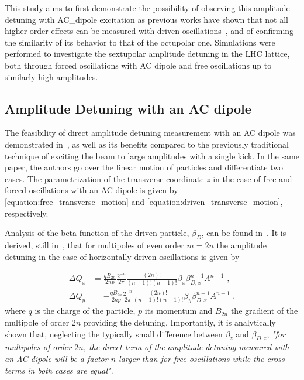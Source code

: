 This study aims to first demonstrate the possibility of observing this amplitude detuning with \gls{AC_dipole} excitation as previous works have shown that not all higher order effects can be measured with driven oscillations~\cite{PRAB:Persson:Suppression_Amplitude_Dependent_Closest_Tune_Approach}, and of confirming the similarity of its behavior to that of the octupolar one.
Simulations were performed to investigate the sextupolar amplitude detuning in the \gls{LHC} lattice, both through forced oscillations with AC dipole and free oscillations up to similarly high amplitudes.

\subsection*{Amplitude Detuning with an AC dipole}

The feasibility of direct amplitude detuning measurement with an AC dipole was demonstrated in~\cite{PRAB:White:Direct_Amplitude_Detuning_AC_Dipole}, as well as its benefits compared to the previously traditional technique of exciting the beam to large amplitudes with a single kick.
In the same paper, the authors go over the linear motion of particles and differentiate two cases.
The parametrization of the transverse coordinate \(z\) in the case of free and forced oscillations with an AC dipole is given by \cref{equation:free_transverse_motion} and \cref{equation:driven_transverse_motion}, respectively.

Analysis of the \gls{beta-function} of the driven particle, \(\beta_D\), can be found in~\cite{PHD:Miyamoto,PRAB:Miyamoto:Parametrization_Driven_Betatron_Oscillation,PRAB:White:Direct_Amplitude_Detuning_AC_Dipole}.
It is derived, still in~\cite{PRAB:White:Direct_Amplitude_Detuning_AC_Dipole}, that for multipoles of even order \(m = 2n\) the amplitude detuning in the case of horizontally driven oscillations is given by

\begin{equation}
    \begin{aligned}
        \Delta Q_x &= \frac{q B_{2n}}{2np} \frac{2^{-n}}{2 \pi} \frac{(2n)!}{(n-1)! (n-1)!} \beta_x \beta_{D,x}^{n-1} A^{n-1} \text{ ,} \\
        \Delta Q_y &= -\frac{q B_{2n}}{2np} \frac{2^{-n}}{2 \pi} \frac{(2n)!}{(n-1)! (n-1)!} \beta_y \beta_{D,x}^{n-1} A^{n-1} \text{ ,}
    \end{aligned}
    \label{eqn:transverse_amp_det}
\end{equation}
where \(q\) is the charge of the particle, \(p\) its momentum and \(B_{2n}\) the gradient of the multipole of order \(2n\) providing the detuning.
Importantly, it is analytically shown that, neglecting the typically small difference between \(\beta_z\) and \(\beta_{D,z}\), \textit{"for multipoles of order \(2n\), the direct term of the amplitude detuning measured with an AC dipole will be a factor \(n\) larger than for free oscillations while the cross terms in both cases are equal"}.

